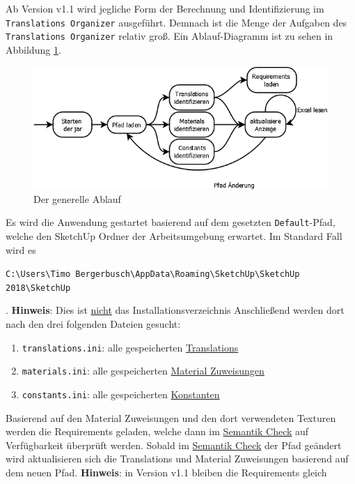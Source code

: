 \documentclass{book}
\newcommand{\assisttool}{\texttt{Translations Organizer}\xspace}
\newcommand{\hinweis}[1]{\newline \textbf{Hinweis}: #1 \newline}
\begin{document}
			Ab Version v1.1 wird jegliche Form der Berechnung und Identifizierung im \assisttool ausgeführt. Demnach ist die Menge der Aufgaben des \assisttool relativ groß. Ein Ablauf-Diagramm ist zu sehen in Abbildung \ref{fig:assist flow}.
			\begin{figure}
				\includegraphics[scale=0.4]{diagramms/translationsOrganizer-ablauf.png}
				\caption{Der generelle Ablauf}
				\label{fig:assist flow}
			\end{figure}
			Es wird die Anwendung gestartet basierend auf dem gesetzten \texttt{Default}-Pfad, welche den SketchUp Ordner der Arbeitsumgebung erwartet. Im Standard Fall wird es \begin{center}
				\texttt{C:\textbackslash Users\textbackslash Timo Bergerbusch\textbackslash AppData\textbackslash Roaming\textbackslash SketchUp\textbackslash SketchUp 2018\textbackslash SketchUp}
			\end{center}.
			\hinweis{Dies ist \underline{nicht} das Installationsverzeichnis}
			Anschließend werden dort nach den drei folgenden Dateien gesucht:
				\begin{enumerate}
					\item \texttt{translations.ini}: alle gespeicherten \hyperref[Translation]{Translations}
					\item \texttt{materials.ini}: alle gespeicherten \hyperref[Material]{Material Zuweisungen}
					\item \texttt{constants.ini}: alle gespeicherten \hyperref[excel konstanten]{Konstanten}
				\end{enumerate}
			Basierend auf den Material Zuweisungen und den dort verwendeten Texturen werden die Requirements geladen, welche dann im \hyperref[semantic check]{Semantik Check} auf Verfügbarkeit überprüft werden. Sobald im \hyperref[semantic check]{Semantik Check} der Pfad geändert wird aktualisieren sich die Translations und Material Zuweisungen basierend auf dem neuen Pfad.
			\hinweis{in Version v1.1 bleiben die Requirements gleich}
			
\end{document}
